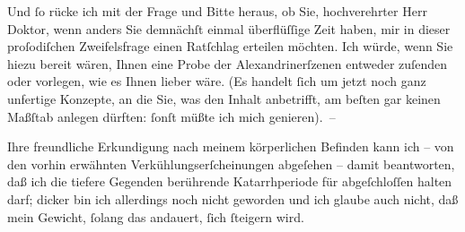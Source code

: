 \pstart
           Und ſo rücke ich mit der Frage und Bitte heraus, ob Sie, hochverehrter Herr Doktor,
               wenn anders Sie demnächſt einmal überflüſſige Zeit haben, mir {\pb}in dieser proſodiſchen Zweifelsfrage einen Ratſchlag
               erteilen möchten. Ich würde, wenn Sie hiezu bereit wären, Ihnen eine Probe der
               Alexandrinerſzenen entweder zuſenden oder vorlegen, wie es Ihnen lieber wäre. (Es
               handelt ſich um jetzt noch ganz unfertige Konzepte, an die Sie, was den Inhalt
               anbetrifft, am beſten gar keinen Maßſtab anlegen dürften: ſonſt müßte ich mich
               genieren). –\pend
           
\pstart
           Ihre freundliche Erkundigung nach meinem körperlichen Befinden kann ich – von den
               vorhin erwähnten Verkühlungserſcheinungen abgeſehen – damit beantworten, daß ich die
               tiefere Gegenden berührende Katarrhperiode für
               abgeſchloſſen halten darf; dicker bin ich allerdings noch nicht geworden und ich
               glaube auch nicht, daß mein Gewicht, ſolang das \label{K_L02246-1v}\label{K_L02246-1} andauert, {\pb}ſich ſteigern wird.\pend
           
